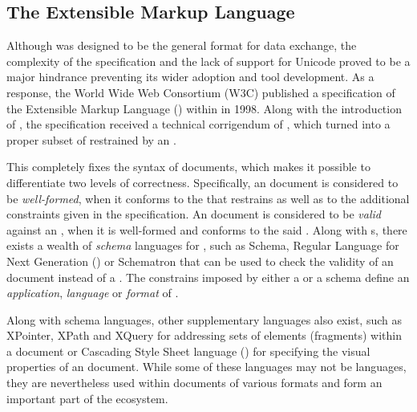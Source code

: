 \documentclass{book}
\begin{document}
      \subsection{The Extensible Markup Language}
        Although  was designed to be the general format for data
        exchange, the complexity of the specification and the lack of support
        for Unicode proved to be a major hindrance preventing its wider
        adoption and tool development. As a response, the World Wide Web
        Consortium (W3C) published a specification of the Extensible Markup
        Language () within \cite{bray98} in 1998. Along with the
        introduction of , the  specification received
        a technical corrigendum of \cite{goldfarb97:webSGML}, which turned
         into a proper subset of  restrained by an
         .
        
        This  completely fixes the syntax of 
        documents, which makes it possible to differentiate two levels of
        correctness. Specifically, an  document is considered to be
        \emph{well-formed}, when it conforms to the  
        that restrains  as well as to the additional constraints
        given in the specification. An  document is considered to
        be \emph{valid} against an  , when it
        is well-formed and conforms to the said  .
        Along with s, there exists a wealth of \emph{schema}
        languages for , such as  Schema, Regular
        Language for  Next Generation () or
        Schematron that can be used to check the validity of an 
        document instead of a . The constrains imposed by either a
         or a schema define an \emph{application}, \emph{language}
        or \emph{format} of .

        
        Along with schema languages, other supplementary languages also exist,
        such as XPointer, XPath and XQuery for addressing sets of elements
        (fragments) within a  document or Cascading Style Sheet
        language () for specifying the visual properties of an
         document. While some of these languages may not be
         languages, they are nevertheless used within documents of
        various  formats and form an important part of the
         ecosystem.
\end{document}
